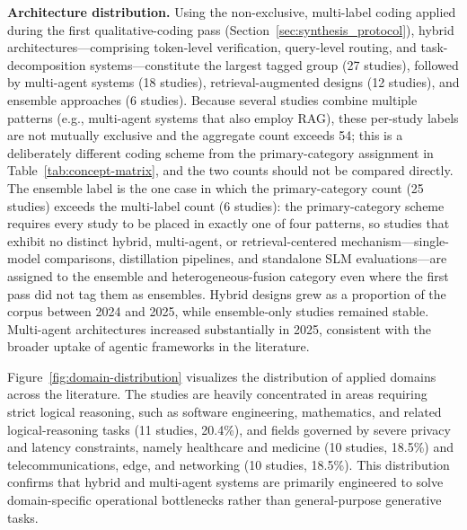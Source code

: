 \textbf{Architecture distribution.} Using the non-exclusive, multi-label coding applied during the first qualitative-coding pass (Section~\ref{sec:synthesis_protocol}), hybrid architectures---comprising token-level verification, query-level routing, and task-decomposition systems---constitute the largest tagged group (27 studies), followed by multi-agent systems (18 studies), retrieval-augmented designs (12 studies), and ensemble approaches (6 studies). Because several studies combine multiple patterns (e.g., multi-agent systems that also employ RAG), these per-study labels are not mutually exclusive and the aggregate count exceeds 54; this is a deliberately different coding scheme from the primary-category assignment in Table~\ref{tab:concept-matrix}, and the two counts should not be compared directly. The ensemble label is the one case in which the primary-category count (25 studies) exceeds the multi-label count (6 studies): the primary-category scheme requires every study to be placed in exactly one of four patterns, so studies that exhibit no distinct hybrid, multi-agent, or retrieval-centered mechanism---single-model comparisons, distillation pipelines, and standalone SLM evaluations---are assigned to the ensemble and heterogeneous-fusion category even where the first pass did not tag them as ensembles. Hybrid designs grew as a proportion of the corpus between 2024 and 2025, while ensemble-only studies remained stable. Multi-agent architectures increased substantially in 2025, consistent with the broader uptake of agentic frameworks in the literature.

Figure~\ref{fig:domain-distribution} visualizes the distribution of applied domains across the literature. The studies are heavily concentrated in areas requiring strict logical reasoning, such as software engineering, mathematics, and related logical-reasoning tasks (11 studies, 20.4\%), and fields governed by severe privacy and latency constraints, namely healthcare and medicine (10 studies, 18.5\%) and telecommunications, edge, and networking (10 studies, 18.5\%). This distribution confirms that hybrid and multi-agent systems are primarily engineered to solve domain-specific operational bottlenecks rather than general-purpose generative tasks.

